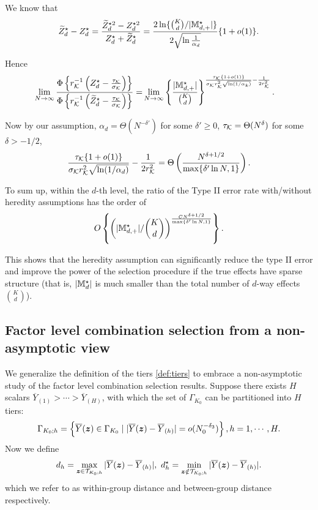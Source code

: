 \documentclass[12pt]{article}
\begin{document}
We know that
\begin{align*}
    \widetilde{Z}_d^\star - {Z}_d^\star = \frac{\widetilde{Z}_d^{\star2} -  {Z}_d^{\star2}}{Z_d^\star + \widetilde{Z}_d^\star} = \frac{2\ln\{{K \choose d}/|{\mathbb{M}}^\star_{d,+}|\}}{2\sqrt{\ln{\frac{1}{\alpha_d}}}}\{1+o(1)\}.
\end{align*}

Hence 
\begin{align*}
    \lim_{N\to\infty}\frac{\Phi\left\{r_{{\mathcal{K}}}^{-1}\left(Z_d^\star - \frac{\tau_{\mathcal{K}}}{\sigma_{\mathcal{K}}}\right)\right\}}{\Phi\left\{r_{{\mathcal{K}}}^{-1}\left(\widetilde{Z}_d^\star - \frac{\tau_{\mathcal{K}}}{\sigma_{\mathcal{K}}}\right)\right\}}
    = & \lim_{N\to\infty} \left\{\frac{|{\mathbb{M}}^\star_{d,+}|}{{K \choose d}}\right\}^{\frac{\tau_{\mathcal{K}}\{1+o(1)\}}{\sigma_{\mathcal{K}} r_{\mathcal{K}}^2\sqrt{\ln(1/\alpha_k)}}-\frac{1}{2r_{\mathcal{K}}^2}}.
\end{align*}

Now by our assumption, $\alpha_d =  \Theta(N^{-\delta'})$ for some $\delta' \ge 0$, $\tau_{\mathcal{K}} =  \Theta(N^\delta)$ for some $\delta>-1/2$, 
\begin{align*}
    \frac{\tau_{\mathcal{K}}\{1+o(1)\}}{\sigma_{\mathcal{K}} r_{\mathcal{K}}^2\sqrt{\ln(1/\alpha_d)}}-\frac{1}{2r_{\mathcal{K}}^2} =  \Theta\left(\frac{N^{\delta + 1/2}}{\max\{\delta'\ln N,1\}}\right).
\end{align*}

To sum up, within the $d$-th level, the ratio of the Type II error rate with/without heredity assumptions has the order of
\begin{align}\label{eqn:typeII-ratio}
    O\left\{\left({|{\mathbb{M}}^\star_{d,+}|}/{K \choose d}\right)^{\frac{CN^{\delta + 1/2}}{\max\{\delta'\ln N,1\}}}\right\}.
\end{align}

This shows that the heredity assumption can significantly reduce the type II error and improve the power of the selection procedure if the true effects have sparse structure (that is, $|{\mathbb{M}}_d^\star|$ is much smaller than the total number of $d$-way effects ${K \choose d}$).  


\subsection{Factor level combination selection from a non-asymptotic view}

We generalize the definition of the tiers \eqref{def:tiers} to embrace a non-asymptotic study of the factor level combination selection results.  Suppose there exists $H$ scalars $\overline{Y}_{(1)} > \cdots > \overline{Y}_{(H)}$, with which the set of $\Gamma_{K_0}$ can be partitioned into $H$ tiers:
\begin{align}\label{eqn:near-tie}
    \Gamma_{K_0;h} = \left\{\overline{Y}({\boldsymbol{z}})\in\Gamma_{K_0}\mid|\overline{Y}({\boldsymbol{z}}) - \overline{Y}_{(h)}| = o(N_0^{-\delta_3})\right\}, h = 1,\cdots,H.
\end{align}
Now we define
\begin{align*}
    d_h = \max_{{\boldsymbol{z}}\in{\mathcal{T}}_{K_0;h} } |\overline{Y}({\boldsymbol{z}}) - \overline{Y}_{(h)}|, ~d^\star_h = \min_{{\boldsymbol{z}}\notin{\mathcal{T}}_{K_0;h}} |\overline{Y}({\boldsymbol{z}}) - \overline{Y}_{(h)}|.
\end{align*}
which we refer to as within-group distance and between-group distance respectively. 
\end{document}

